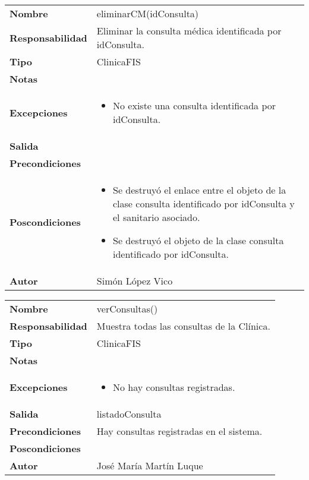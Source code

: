 \documentclass[11pt,a4paper]{article}
\newenvironment{itemizenomargins}
    {\begin{minipage}[t]{1\linewidth}\begin{itemize}}
    {\end{itemize}\end{minipage}}
\begin{document}
\begin{table}[H]
	\centering
	\label{my-label}
	\begin{tabularx}{\textwidth}{l|X}
		\textbf{Nombre}          & eliminarCM(idConsulta)\\
		\textbf{Responsabilidad} & Eliminar la consulta médica identificada por idConsulta. \\
		\textbf{Tipo}            & ClinicaFIS \\
		\textbf{Notas}           &  \\
		\textbf{Excepciones}     &
		\begin{itemizenomargins}
			\item No existe una consulta identificada por idConsulta.
		\end{itemizenomargins} \\
		\textbf{Salida}          &  \\
		\textbf{Precondiciones}  &  \\
		\textbf{Poscondiciones}  & 
		\begin{itemizenomargins}
			\item Se destruyó el enlace entre el objeto de la clase consulta identificado por idConsulta y el sanitario asociado.
			\item Se destruyó el objeto de la clase consulta identificado por idConsulta.
		\end{itemizenomargins} \\
		\textbf{Autor}			 & Simón López Vico
	\end{tabularx}
\end{table}

\begin{table}[H]
	\centering
	\label{my-label}
	\begin{tabularx}{\textwidth}{l|X}
    \textbf{Nombre}          & verConsultas()\\
		\textbf{Responsabilidad} & Muestra todas las consultas de la Clínica. \\
		\textbf{Tipo}            & ClinicaFIS \\
		\textbf{Notas}           &  \\
		\textbf{Excepciones}     &
		\begin{itemizenomargins}
			\item No hay consultas registradas.
		\end{itemizenomargins} \\
		\textbf{Salida}          &  listadoConsulta\\
		\textbf{Precondiciones}  &  Hay consultas registradas en el sistema.\\
		\textbf{Poscondiciones}  & \\  
		\textbf{Autor}			 & José María Martín Luque
	\end{tabularx}
\end{table}
\end{document}
